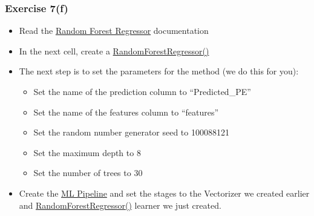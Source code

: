 \documentclass[11pt]{article}
\providecommand{\tightlist}{%
      \setlength{\itemsep}{0pt}\setlength{\parskip}{0pt}}
\begin{document}
\hypertarget{exercise-7f}{%
\subsubsection{Exercise 7(f)}\label{exercise-7f}}

\begin{itemize}
\tightlist
\item
  Read the
  \href{https://spark.apache.org/docs/latest/api/python/reference/api/pyspark.ml.regression.RandomForestRegressor.html?highlight=randomforestregressor\#pyspark.ml.regression.RandomForestRegressor}{Random
  Forest Regressor} documentation
\item
  In the next cell, create a
  \href{https://spark.apache.org/docs/latest/api/python/reference/api/pyspark.ml.regression.RandomForestRegressor.html?highlight=randomforestregressor\#pyspark.ml.regression.RandomForestRegressor}{RandomForestRegressor()}
\item
  The next step is to set the parameters for the method (we do this for
  you):

  \begin{itemize}
  \tightlist
  \item
    Set the name of the prediction column to ``Predicted\_PE''
  \item
    Set the name of the features column to ``features''
  \item
    Set the random number generator seed to 100088121
  \item
    Set the maximum depth to 8
  \item
    Set the number of trees to 30
  \end{itemize}
\item
  Create the
  \href{https://spark.apache.org/docs/latest/api/python/reference/api/pyspark.ml.Pipeline.html}{ML
  Pipeline} and set the stages to the Vectorizer we created earlier and
  \href{https://spark.apache.org/docs/latest/api/python/reference/api/pyspark.ml.regression.RandomForestRegressor.html?highlight=randomforestregressor\#pyspark.ml.regression.RandomForestRegressor}{RandomForestRegressor()}
  learner we just created.
\end{itemize}
\end{document}

